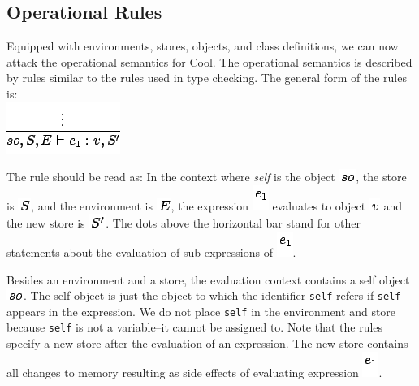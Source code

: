 \documentclass[]{article}
\begin{document}
\subsection{Operational Rules}

Equipped with environments, stores, objects, and class definitions, we
can now attack the operational semantics for Cool. The operational
semantics is described by rules similar to the rules used in type
checking. The general form of the rules is: \\

\includegraphics{img155.png}

The rule should be read as: In the context where \emph{self} is the
object \includegraphics{img156.png}, the store is
\includegraphics{img129.png}, and the environment is
\includegraphics{img125.png}, the expression \includegraphics{img76.png}
evaluates to object \includegraphics{img59.png} and the new store is
\includegraphics{img126.png}. The dots above the horizontal bar stand
for other statements about the evaluation of sub-expressions of
\includegraphics{img76.png}.

Besides an environment and a store, the evaluation context contains a
self object \includegraphics{img156.png}. The self object is just the
object to which the identifier \texttt{self} refers if \texttt{self}
appears in the expression. We do not place \texttt{self} in the
environment and store because \texttt{self} is not a variable--it cannot
be assigned to. Note that the rules specify a new store after the
evaluation of an expression. The new store contains all changes to
memory resulting as side effects of evaluating expression
\includegraphics{img76.png}.
\end{document}
